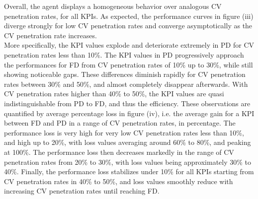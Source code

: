 Overall, the agent displays a homogeneous behavior over analogous CV penetration rates, for all KPIs. As expected, the performance curves in figure (iii) diverge strongly for low CV penetration rates and converge asymptotically as the CV penetration rate increases. \\

More specifically, the KPI values explode and deteriorate extremely in PD for CV penetration rates less than 10\%. The KPI values in PD progressively approach the performances for FD from CV penetration rates of 10\% up to 30\%, while still showing noticeable gaps. These differences diminish rapidly for CV penetration rates between 30\% and 50\%, and almost completely disappear afterwards. With CV penetration rates higher than 40\% to 50\%, the KPI values are quasi indistinguishable from PD to FD, and thus the efficiency.
These observations are quantified by average percentage loss in figure (iv), i.e. the average gain for a KPI between FD and PD in a range of CV penetration rates, in percentage. The performance loss is very high for very low CV penetration rates less than 10\%, and high up to 20\%, with loss values averaging around 60\% to 80\%, and peaking at 100\%. The performance loss then decreases markedly in the range of CV penetration rates from 20\% to 30\%, with loss values being approximately 30\% to 40\%. Finally, the performance loss stabilizes under 10\% for all KPIs starting from CV penetration rates in 40\% to 50\%, and loss values smoothly reduce with increasing CV penetration rates until reaching FD. \\

